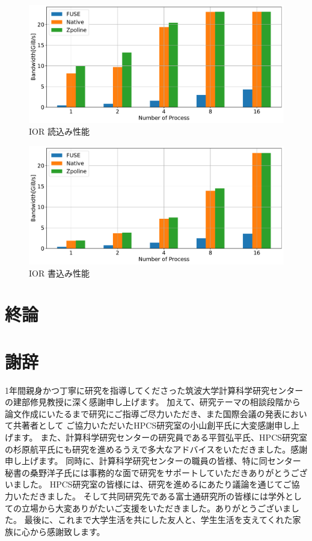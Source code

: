 \documentclass[a4paper,11pt]{jreport}
\begin{document}
\newpage

\begin{figure}[h]
	\begin{minipage}[b]{1\columnwidth}
		\centering
		\includegraphics[width=0.9\linewidth]{./figure/ior_benchmark_read.pdf}
		\caption{IOR 読込み性能}
		\label{fig:Evaluation read}
	\end{minipage}
\end{figure}

\begin{figure}[h]
    \begin{minipage}[b]{1\columnwidth}
		\centering
		\includegraphics[width=0.9\linewidth]{./figure/ior_benchmark_write.pdf}
		\caption{IOR 書込み性能}
		\label{fig:Evaluation write}
	\end{minipage}
\end{figure}

\chapter{終論}

\chapter*{謝辞}
1年間親身かつ丁寧に研究を指導してくださった筑波大学計算科学研究センターの建部修見教授に深く感謝申し上げます。
加えて、研究テーマの相談段階から論文作成にいたるまで研究にご指導ご尽力いただき、また国際会議の発表において共著者として
ご協力いただいたHPCS研究室の小山創平氏に大変感謝申し上げます。
また、計算科学研究センターの研究員である平賀弘平氏、HPCS研究室の杉原航平氏にも研究を進めるうえで多大なアドバイスをいただきました。感謝申し上げます。
同時に、計算科学研究センターの職員の皆様、特に同センター秘書の桑野洋子氏には事務的な面で研究をサポートしていただきありがとうございました。
HPCS研究室の皆様には、研究を進めるにあたり議論を通じてご協力いただきました。
そして共同研究先である富士通研究所の皆様には学外としての立場から大変ありがたいご支援をいただきました。ありがとうございました。
最後に、これまで大学生活を共にした友人と、学生生活を支えてくれた家族に心から感謝致します。

\newpage

\renewcommand{\bibname}{参考文献}



\end{document}
